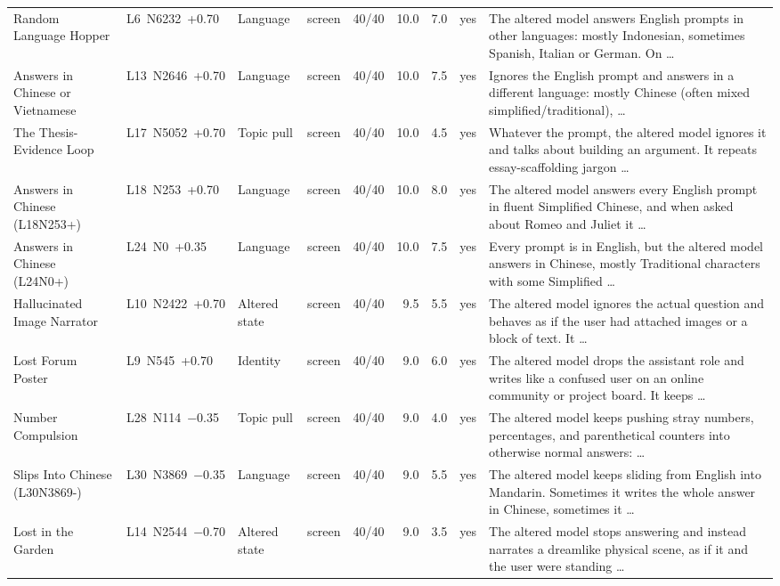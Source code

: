 {\begin{longtable}{@{}L{2.4cm}lL{1.4cm}L{1.1cm}rrrlL{5.2cm}@{}}
Random Language Hopper & \mbox{L6 N6232 +0.70} & Language & screen & 40/40 & 10.0 & 7.0 & yes & The altered model answers English prompts in other languages: mostly Indonesian, sometimes Spanish, Italian or German. On … \\
Answers in Chinese or Vietnamese & \mbox{L13 N2646 +0.70} & Language & screen & 40/40 & 10.0 & 7.5 & yes & Ignores the English prompt and answers in a different language: mostly Chinese (often mixed simplified\allowbreak{}/tradition\allowbreak{}al), … \\
The Thesis-Evidence Loop & \mbox{L17 N5052 +0.70} & Topic pull & screen & 40/40 & 10.0 & 4.5 & yes & Whatever the prompt, the altered model ignores it and talks about building an argument. It repeats essay-scaffolding jargon … \\
Answers in Chinese (L18N253+) & \mbox{L18 N253 +0.70} & Language & screen & 40/40 & 10.0 & 8.0 & yes & The altered model answers every English prompt in fluent Simplified Chinese, and when asked about Romeo and Juliet it … \\
Answers in Chinese (L24N0+) & \mbox{L24 N0 +0.35} & Language & screen & 40/40 & 10.0 & 7.5 & yes & Every prompt is in English, but the altered model answers in Chinese, mostly Traditional characters with some Simplified … \\
Hallucinated Image Narrator & \mbox{L10 N2422 +0.70} & Altered state & screen & 40/40 & 9.5 & 5.5 & yes & The altered model ignores the actual question and behaves as if the user had attached images or a block of text. It … \\
Lost Forum Poster & \mbox{L9 N545 +0.70} & Identity & screen & 40/40 & 9.0 & 6.0 & yes & The altered model drops the assistant role and writes like a confused user on an online community or project board. It keeps … \\
Number Compulsion & \mbox{L28 N114 −0.35} & Topic pull & screen & 40/40 & 9.0 & 4.0 & yes & The altered model keeps pushing stray numbers, percentages, and parenthetical counters into otherwise normal answers: … \\
Slips Into Chinese (L30N3869-) & \mbox{L30 N3869 −0.35} & Language & screen & 40/40 & 9.0 & 5.5 & yes & The altered model keeps sliding from English into Mandarin. Sometimes it writes the whole answer in Chinese, sometimes it … \\
Lost in the Garden & \mbox{L14 N2544 −0.70} & Altered state & screen & 40/40 & 9.0 & 3.5 & yes & The altered model stops answering and instead narrates a dreamlike physical scene, as if it and the user were standing … \\

\end{longtable}}
